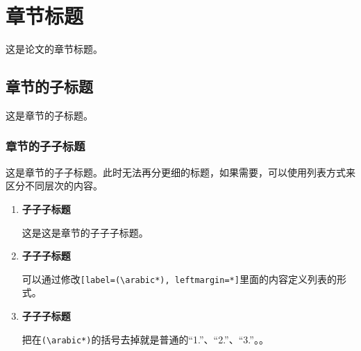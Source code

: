 \section{章节标题}
这是论文的章节标题。

\subsection{章节的子标题}
这是章节的子标题。

\subsubsection{章节的子子标题}
    这是章节的子子标题。此时无法再分更细的标题，如果需要，可以使用列表方式来区分不同层次的内容。

    \begin{enumerate}[label=(\arabic*), leftmargin=*]
        \item \textbf{子子子标题}
        
        这是这是章节的子子子标题。
        
        \item \textbf{子子子标题}
        
        可以通过修改\verb|[label=(\arabic*), leftmargin=*]|里面的内容定义列表的形式。
        
        \item \textbf{子子子标题}
        
        把在\verb|(\arabic*)|的括号去掉就是普通的“1.”、“2.”、“3.”。。
    \end{enumerate}

